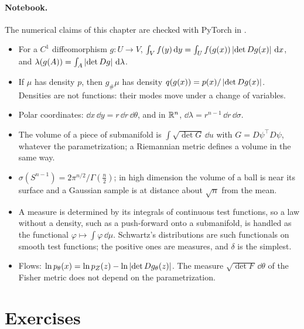 \begin{notechapter}
\paragraph{Notebook.} The numerical claims of this chapter are checked
with PyTorch in .

\begin{chaptersummary}
\begin{itemize}[nosep]
  \item For a $C^1$ diffeomorphism $g:U\to V$,
        $\int_Vf(y)\,\mathrm{d} y = \int_Uf(g(x))\left|\det Dg(x)\right|\,\mathrm{d} x$, and
        $\lambda(g(A)) = \int_A\left|\det Dg\right|\,\mathrm{d}\lambda$.
  \item If $\mu$ has density $p$, then $g_\#\mu$ has density
        $q(g(x)) = p(x)/\left|\det Dg(x)\right|$. Densities are not functions:
        their modes move under a change of variables.
  \item Polar coordinates: $\dd x\,\dd y = r\,\dd r\,\dd\theta$, and in
        $\mathbb{R}^n$, $\dd\lambda = r^{n-1}\,\dd r\,\dd\sigma$.
  \item The volume of a piece of submanifold is
        $\int\sqrt{\det G}\,\dd u$ with $G = D\psi^\top D\psi$,
        whatever the parametrization; a Riemannian metric defines a
        volume in the same way.
  \item $\sigma(S^{n-1}) = 2\pi^{n/2}/\Gamma(\frac n2)$; in high
        dimension the volume of a ball is near its surface and a
        Gaussian sample is at distance about $\sqrt n$ from the mean.
  \item A measure is determined by its integrals of continuous test
        functions, so a law without a density, such as a push-forward
        onto a submanifold, is handled as the functional
        $\varphi\mapsto\int\varphi\,\dd\mu$. Schwartz's distributions are
        such functionals on smooth test functions; the positive ones are
        measures, and $\delta$ is the simplest.
  \item Flows: $\ln p_\theta(x) = \ln p_Z(z) - \ln\left|\det Dg_\theta(z)\right|$.
        The measure $\sqrt{\det F}\,\dd\theta$ of the Fisher metric does
        not depend on the parametrization.
\end{itemize}
\end{chaptersummary}

\section*{Exercises}


\end{notechapter}

